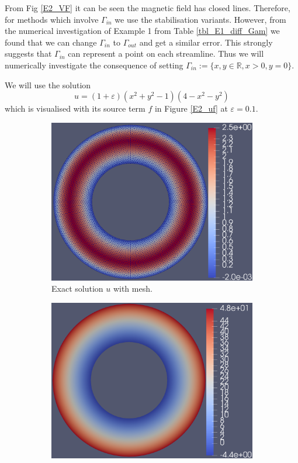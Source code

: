 \documentclass[12pt]{ociamthesis}
\begin{document}
From Fig \ref{E2_VF} it can be seen the magnetic field has closed lines. Therefore, for methods which involve $\Gamma_{in}$ we use the stabilisation variants. However, from the numerical investigation of Example 1 from Table \ref{tbl_E1_diff_Gam} we found that we can change $\Gamma_{in}$ to $\Gamma_{out}$ and get a similar error. This strongly suggests that $\Gamma_{in}$ can represent a point on each streamline. Thus we will numerically investigate the consequence of setting $\Gamma_{in}:=\{x,y \in \mathbb{R}, x>0, y=0\}$.

We will use the solution
\begin{equation}
u = (1+\varepsilon)(x^2 + y^2 -1)(4-x^2-y^2)
\end{equation}
which is visualised with its source term $f$ in Figure \ref{E2_uf} at $\varepsilon = 0.1$.
\begin{figure}[H]
 \begin{subfigure}{0.5\textwidth}
     \includegraphics[width=\textwidth]{Pics/uf/U_E2_eps_1.png}
     \caption{Exact solution $u$ with mesh.}
 \end{subfigure}
   \begin{subfigure}{0.5\textwidth}
     \includegraphics[width=\textwidth]{Pics/uf/F_E2_eps_1.png}

\end{subfigure}
\end{figure}
\end{document}
